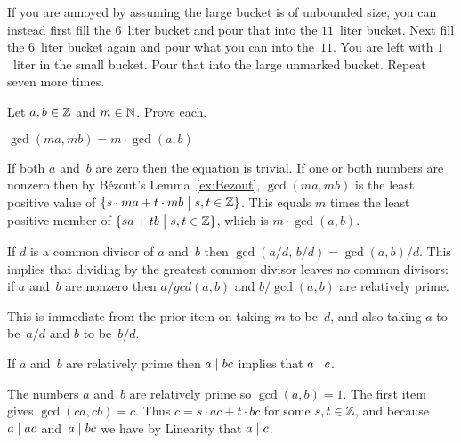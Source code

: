\documentclass{test}  %
\begin{document}
\begin{bezoutproof}
\begin{problem}
\begin{answer}
If you are annoyed by assuming the large bucket is of unbounded size, you
can instead
first fill the $6$~liter bucket and pour that into the $11$~liter bucket.
Next fill the $6$~liter bucket again and pour what you can into the~$11$.
You are left with $1$~liter in the small bucket.  
Pour that into the large unmarked bucket.
Repeat seven more times.    
\end{answer}
\end{problem}

\begin{problem}  \label{ex:EuclidsLemma}
Let $a,b\in\mathbb{Z}$ and $m\in\mathbb{N}$. 
Prove each.
\begin{exes}
\begin{exercise} 
  $\gcd(ma,mb)=m\cdot\gcd(a,b)$
\end{exercise}
\begin{answer}
  If both $a$ and~$b$ are zero then the equation is trivial.
  If one or both numbers are nonzero then by 
  B\'ezout's Lemma~\ref{ex:Bezout}, $\gcd(ma,mb)$ is the least
  positive value of $\{s\cdot ma+t\cdot mb \bigm| s,t\in\mathbb{Z}\}$.
  This equals $m$ times the least positive member of 
  $\{sa+tb \bigm| s,t\in\mathbb{Z}\}$, 
  which is $m\cdot\gcd(a,b)$.  
\end{answer}
\begin{exercise} 
  If $d$ is a common divisor of $a$ and~$b$ then 
  $\gcd(a/d,\,b/d)=\gcd(a,b)/d$.
  This implies that 
  dividing by the greatest common divisor leaves no common divisors:
  if $a$ and~$b$ are nonzero then $a/gcd(a,b)$ and $b/\gcd(a,b)$
  are relatively prime.
\end{exercise}
\begin{answer}
  This is immediate from the prior item on taking $m$ to be~$d$, 
  and also taking $a$ to be~$a/d$ and $b$ to be~$b/d$.       
\end{answer}
\begin{exercise}   
  If $a$ and~$b$ are relatively prime then $a\mid bc$ implies that 
  $a\mid c$.
\end{exercise}
\begin{answer}
  The numbers $a$ and~$b$ are relatively prime so $\gcd(a,b)=1$.
  The first item gives $\gcd(ca,cb)=c$.
  Thus $c=s\cdot ac+t\cdot bc$ for some $s,t\in\mathbb{Z}$, and
  because $a\mid ac$ and~$a\mid bc$ we have by Linearity that
  $a\mid c$.
\end{answer}
\end{exes}

\end{problem}
\end{bezoutproof}
\end{document}
